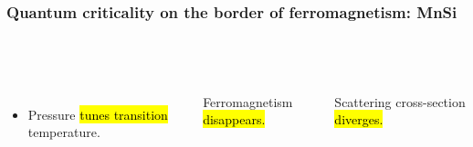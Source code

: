 \begin{frame}[label=BorderFM2]
\frametitle{Quantum criticality on the border of ferromagnetism: MnSi}

\vspace{-4ex}

\begin{columns}[t]
  
    \centerline{~}

  \begin{columns}[t]
      \centerline{~}
      \centerline{~}
    \end{columns}
\end{columns}

\begin{minipage}{\textwidth}
  \begin{columns}[t]
    \begin{itemize}
    \item<1->
      Pressure \hl{tunes transition} temperature.
    \end{itemize}
    \bi
    \item<2-> Ferro\-mag\-netism \hl{disappears.}
    \ei
    \bi
    \item<3-> Scattering cross-section \hl{diverges.}
    \ei
    
  \end{columns}
\end{minipage}

\end{frame}

